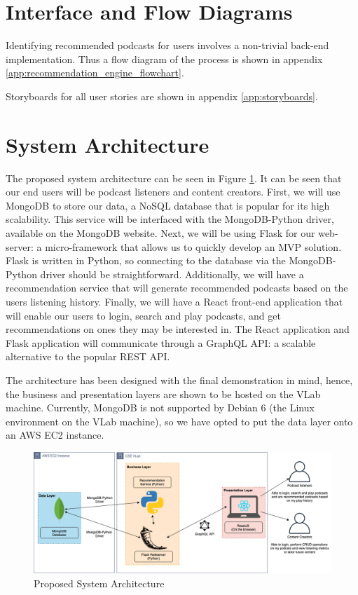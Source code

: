 \documentclass[12pt]{article}
\begin{document}
\newpage
\section{Interface and Flow Diagrams}

Identifying recommended podcasts for users involves a non-trivial back-end implementation. Thus a flow diagram of the process is shown in appendix \ref{app:recommendation_engine_flowchart}.

Storyboards for all user stories are shown in appendix \ref{app:storyboards}.


\section{System Architecture}

The proposed system architecture can be seen in Figure \ref{fig:SysArch}.
It can be seen that our end users will be podcast listeners and content creators.
First, we will use MongoDB\cite{MongoDB2020} to store our data, a NoSQL database that is popular for its high scalability.
This service will be interfaced with the MongoDB-Python driver, available on the MongoDB website\cite{MongoDB2020}.
Next, we will be using Flask\cite{flask} for our web-server: a micro-framework that allows us to quickly develop an MVP solution.
Flask is written in Python, so connecting to the database via the MongoDB-Python driver should be straightforward.
Additionally, we will have a recommendation service that will generate recommended podcasts based on the users listening history.
Finally, we will have a React\cite{react} front-end application that will enable our users to login, search and play podcasts, and get recommendations on ones they may be interested in.
The React application and Flask application will communicate through a GraphQL API: a scalable alternative to the popular REST API\cite{graphql}.

The architecture has been designed with the final demonstration in mind, hence, the business and presentation layers are shown to be hosted on the VLab machine.
Currently, MongoDB is not supported by Debian 6 (the Linux environment on the VLab machine), so we have opted to put the data layer onto an AWS EC2 instance\cite{aws_ec2}.

\begin{figure}[h]
    \centering
    \includegraphics[width=\textwidth]{resources/SystemArchitecture}
    \caption{Proposed System Architecture}
    \label{fig:SysArch}
\end{figure}
\end{document}

